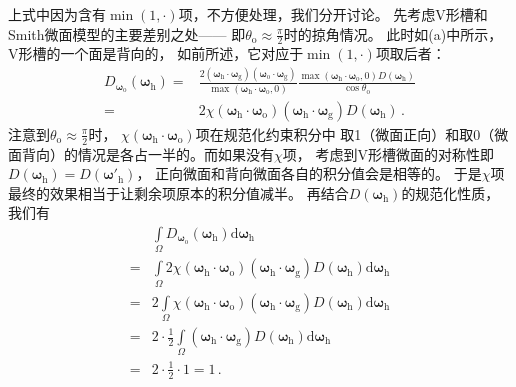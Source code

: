 上式中因为含有$\min(1,\cdot)$项，不方便处理，我们分开讨论。
先考虑V形槽和Smith微面模型的主要差别之处——
即$\displaystyle\theta_{\mathrm{o}}\approx\frac{\pi}{2}$时的掠角情况。
此时如(a)中所示，V形槽的一个面是背向的，
如前所述，它对应于$\min(1,\cdot)$项取后者：
\begin{align}
    D_{{\bm\omega}_{\mathrm{o}}}({\bm\omega}_{\mathrm{h}})
    = & \frac{2({\bm\omega}_{\mathrm{h}}\cdot{\bm\omega}_{\mathrm{g}})
    ({\bm\omega}_{\mathrm{o}}\cdot{\bm\omega}_{\mathrm{g}})}
    {\max({\bm\omega}_{\mathrm{h}}\cdot{\bm\omega}_{\mathrm{o}},0)}
    \frac{\max({\bm\omega}_{\mathrm{h}}\cdot{\bm\omega}_{\mathrm{o}},0)
        D({\bm\omega}_{\mathrm{h}})}{\cos\theta_{\mathrm{o}}}\nonumber \\
    = & 2\chi({\bm\omega}_{\mathrm{h}}\cdot{\bm\omega}_{\mathrm{o}})
    ({\bm\omega}_{\mathrm{h}}\cdot{\bm\omega}_{\mathrm{g}})
    D({\bm\omega}_{\mathrm{h}})\, .
\end{align}
注意到$\displaystyle\theta_{\mathrm{o}}\approx\frac{\pi}{2}$时，
$\chi({\bm\omega}_{\mathrm{h}}\cdot{\bm\omega}_{\mathrm{o}})$项在规范化约束积分中
取1（微面正向）和取0（微面背向）的情况是各占一半的。而如果没有$\chi$项，
考虑到V形槽微面的对称性即$D({\bm\omega}_{\mathrm{h}})=D({\bm\omega}'_{\mathrm{h}})$，
正向微面和背向微面各自的积分值会是相等的。
于是$\chi$项最终的效果相当于让剩余项原本的积分值减半。
再结合$D({\bm\omega}_{\mathrm{h}})$的规范化性质，
我们有
\begin{align}
      & \int\limits_{\varOmega}D_{{\bm\omega}_{\mathrm{o}}}({\bm\omega}_{\mathrm{h}})
    \mathrm{d}{\bm\omega}_{\mathrm{h}}\nonumber                                                         \\
    = & \int\limits_{\varOmega}2\chi({\bm\omega}_{\mathrm{h}}\cdot{\bm\omega}_{\mathrm{o}})
    ({\bm\omega}_{\mathrm{h}}\cdot{\bm\omega}_{\mathrm{g}})
    D({\bm\omega}_{\mathrm{h}})\mathrm{d}{\bm\omega}_{\mathrm{h}}\nonumber                              \\
    = & 2\int\limits_{\varOmega}\chi({\bm\omega}_{\mathrm{h}}\cdot{\bm\omega}_{\mathrm{o}})
    ({\bm\omega}_{\mathrm{h}}\cdot{\bm\omega}_{\mathrm{g}})
    D({\bm\omega}_{\mathrm{h}})\mathrm{d}{\bm\omega}_{\mathrm{h}}\nonumber                              \\
    = & 2\cdot\frac{1}{2}\int\limits_{\varOmega}({\bm\omega}_{\mathrm{h}}\cdot{\bm\omega}_{\mathrm{g}})
    D({\bm\omega}_{\mathrm{h}})\mathrm{d}{\bm\omega}_{\mathrm{h}}\nonumber                              \\
    = & 2\cdot\frac{1}{2}\cdot1=1\, .
\end{align}

